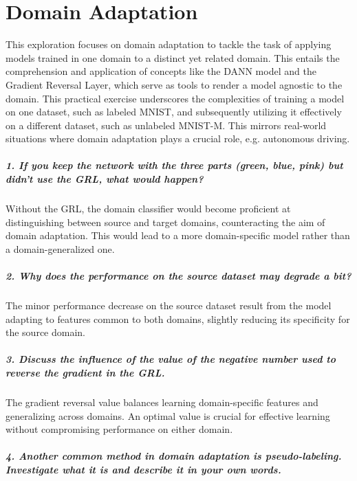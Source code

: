 \chapter{Domain Adaptation}
\graphicspath{{figs/2c/}}

This exploration focuses on domain adaptation to tackle the task of applying models trained in one domain to a distinct yet related domain. This entails the comprehension and application of concepts like the DANN model and the Gradient Reversal Layer, which serve as tools to render a model agnostic to the domain. This practical exercise underscores the complexities of training a model on one dataset, such as labeled MNIST, and subsequently utilizing it effectively on a different dataset, such as unlabeled MNIST-M. This mirrors real-world situations where domain adaptation plays a crucial role, e.g. autonomous driving.

\paragraph*{1. If you keep the network with the three parts (green, blue, pink) but didn't use the GRL, what would happen?}

Without the GRL, the domain classifier would become proficient at distinguishing between source and target domains, counteracting the aim of domain adaptation. This would lead to a more domain-specific model rather than a domain-generalized one.

\paragraph*{2. Why does the performance on the source dataset may degrade a bit?}

The minor performance decrease on the source dataset result from the model adapting to features common to both domains, slightly reducing its specificity for the source domain.

\paragraph*{3. Discuss the influence of the value of the negative number used to reverse the gradient in the GRL.}

The gradient reversal value balances learning domain-specific features and generalizing across domains. An optimal value is crucial for effective learning without compromising performance on either domain.

\paragraph*{4. Another common method in domain adaptation is pseudo-labeling. Investigate what it is and describe it in your own words.}

